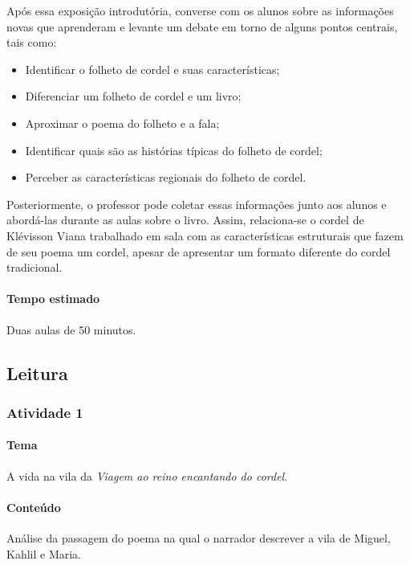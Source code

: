 \documentclass[11pt]{extarticle}
\begin{document}
Após essa exposição introdutória, converse com os alunos sobre as informações novas que aprenderam e levante um debate em torno de alguns pontos centrais, tais como:

\begin{itemize}
\item Identificar o folheto de cordel e suas características;

\item Diferenciar um folheto de cordel e um livro;

\item Aproximar o poema do folheto e a fala;

\item Identificar quais são as histórias típicas do folheto de cordel;

\item Perceber as características regionais do folheto de cordel.
\end{itemize}

Posteriormente, o professor pode coletar essas informações junto aos alunos e abordá-las durante as aulas sobre o livro. Assim, relaciona-se o cordel de Klévisson Viana trabalhado em sala com as características estruturais que fazem de seu poema um cordel, apesar de apresentar um formato diferente do cordel tradicional.


\paragraph{Tempo estimado} Duas aulas de 50 minutos.


\subsection{Leitura}

\subsubsection{Atividade 1}


\paragraph{Tema} A vida na vila da \textit{Viagem ao reino encantando do cordel}.

\paragraph{Conteúdo} Análise da passagem do poema na qual o narrador descrever a vila de Miguel, Kahlil e Maria.
\end{document}
